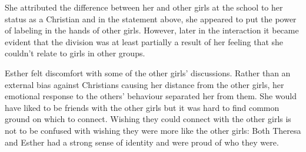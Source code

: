 \vspace{5 mm}
  
\noindent She attributed the difference between her and other girls at the school to her status as a Christian and in the statement above, she appeared to put the power of labeling in the hands of other girls. However, later in the interaction it became evident that the division was at least partially a result of her feeling that she couldn't relate to girls in other groups.


\vspace{5 mm}

\noindent Esther felt discomfort with some of the other girls' discussions. Rather than an external bias against Christians causing her distance from the other girls, her emotional response to the others' behaviour separated her from them. She would have liked to be friends with the other girls but it was hard to find common ground on which to connect. Wishing they could connect with the other girls is not to be confused with wishing they were more like the other girls: Both Theresa and Esther had a strong sense of identity and were proud of who they were.

